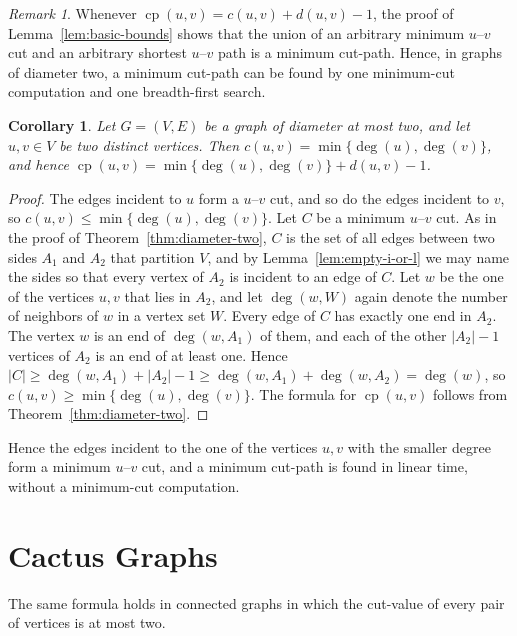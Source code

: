 \documentclass[a4paper,fleqn]{cas-sc}
\numberwithin{equation}{section}
\theoremstyle{definition}
\theoremstyle{plain}
\newtheorem{corollary}[definition]{Corollary}
\theoremstyle{remark}
\newtheorem{remark}[definition]{Remark}
\newcommand{\cp}{\operatorname{cp}}                  %
\begin{document}
\begin{remark}
\label{rem:algorithm}
Whenever $\cp(u, v) = c(u, v) + d(u, v) - 1$, the proof of Lemma~\ref{lem:basic-bounds} shows that the union of an arbitrary minimum $u$--$v$ cut and an arbitrary shortest $u$--$v$ path is a minimum cut-path.
Hence, in graphs of diameter two, a minimum cut-path can be found by one minimum-cut computation and one breadth-first search.
\end{remark}

\begin{corollary}
\label{cor:diameter-two-degrees}
Let $G = (V, E)$ be a graph of diameter at most two, and let $u, v \in V$ be two distinct vertices.
Then $c(u, v) = \min\{\deg(u), \deg(v)\}$, and hence $\cp(u, v) = \min\{\deg(u), \deg(v)\} + d(u, v) - 1$.
\end{corollary}

\begin{proof}
The edges incident to $u$ form a $u$--$v$ cut, and so do the edges incident to $v$, so $c(u, v) \leq \min\{\deg(u), \deg(v)\}$.
Let $C$ be a minimum $u$--$v$ cut.
As in the proof of Theorem~\ref{thm:diameter-two}, $C$ is the set of all edges between two sides $A_1$ and $A_2$ that partition $V$, and by Lemma~\ref{lem:empty-i-or-l} we may name the sides so that every vertex of $A_2$ is incident to an edge of $C$.
Let $w$ be the one of the vertices $u, v$ that lies in $A_2$, and let $\deg(w, W)$ again denote the number of neighbors of $w$ in a vertex set $W$.
Every edge of $C$ has exactly one end in $A_2$.
The vertex $w$ is an end of $\deg(w, A_1)$ of them, and each of the other $|A_2| - 1$ vertices of $A_2$ is an end of at least one.
Hence $|C| \geq \deg(w, A_1) + |A_2| - 1 \geq \deg(w, A_1) + \deg(w, A_2) = \deg(w)$, so $c(u, v) \geq \min\{\deg(u), \deg(v)\}$.
The formula for $\cp(u, v)$ follows from Theorem~\ref{thm:diameter-two}.
\end{proof}

Hence the edges incident to the one of the vertices $u, v$ with the smaller degree form a minimum $u$--$v$ cut, and a minimum cut-path is found in linear time, without a minimum-cut computation.

\section{Cactus Graphs}
\label{sec:cut-two}

The same formula holds in connected graphs in which the cut-value of every pair of vertices is at most two.
\end{document}
